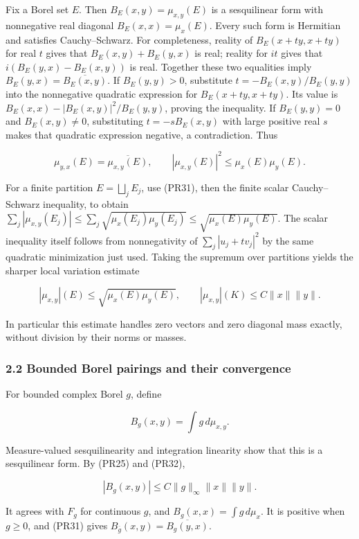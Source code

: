 \documentclass[
  11pt,
]{article}
\begin{document}
Fix a Borel set \(E\). Then \(B_E(x,y)=\mu_{x,y}(E)\) is a sesquilinear
form with nonnegative real diagonal \(B_E(x,x)=\mu_x(E)\). Every such
form is Hermitian and satisfies Cauchy--Schwarz. For completeness,
reality of \(B_E(x+t y,x+t y)\) for real \(t\) gives that
\(B_E(x,y)+B_E(y,x)\) is real; reality for \(it\) gives that
\(i(B_E(y,x)-B_E(x,y))\) is real. Together these two equalities imply
\(B_E(y,x)=\overline{B_E(x,y)}\). If \(B_E(y,y)>0\), substitute
\(t=-B_E(x,y)/B_E(y,y)\) into the nonnegative quadratic expression for
\(B_E(x+t y,x+t y)\). Its value is \(B_E(x,x)-|B_E(x,y)|^2/B_E(y,y)\),
proving the inequality. If \(B_E(y,y)=0\) and \(B_E(x,y)\ne0\),
substituting \(t=-sB_E(x,y)\) with large positive real \(s\) makes that
quadratic expression negative, a contradiction. Thus

\[
\mu_{y,x}(E)=\overline{\mu_{x,y}(E)},\qquad
|\mu_{x,y}(E)|^2\leq\mu_x(E)\mu_y(E).
\tag{PR31}
\]

For a finite partition \(E=\bigsqcup_jE_j\), use (PR31), then the finite
scalar Cauchy--Schwarz inequality, to obtain
\(\sum_j|\mu_{x,y}(E_j)|\leq\sum_j\sqrt{\mu_x(E_j)\mu_y(E_j)}\leq\sqrt{\mu_x(E)\mu_y(E)}\).
The scalar inequality itself follows from nonnegativity of
\(\sum_j|u_j+t v_j|^2\) by the same quadratic minimization just used.
Taking the supremum over partitions yields the sharper local variation
estimate

\[
|\mu_{x,y}|(E)\leq\sqrt{\mu_x(E)\mu_y(E)},
\qquad
|\mu_{x,y}|(K)\leq C\|x\|\|y\|.
\tag{PR32}
\]

In particular this estimate handles zero vectors and zero diagonal mass
exactly, without division by their norms or masses.

\subsubsection{2.2 Bounded Borel pairings and their
convergence}\label{bounded-borel-pairings-and-their-convergence}

For bounded complex Borel \(g\), define

\[
B_g(x,y)=\int g\,d\mu_{x,y}.
\tag{PR33}
\]

Measure-valued sesquilinearity and integration linearity show that this
is a sesquilinear form. By (PR25) and (PR32),

\[
|B_g(x,y)|\leq C\|g\|_\infty\|x\|\|y\|.
\tag{PR34}
\]

It agrees with \(F_g\) for continuous \(g\), and
\(B_g(x,x)=\int g\,d\mu_x\). It is positive when \(g\geq0\), and (PR31)
gives \(B_{\overline g}(x,y)=\overline{B_g(y,x)}\).
\end{document}
